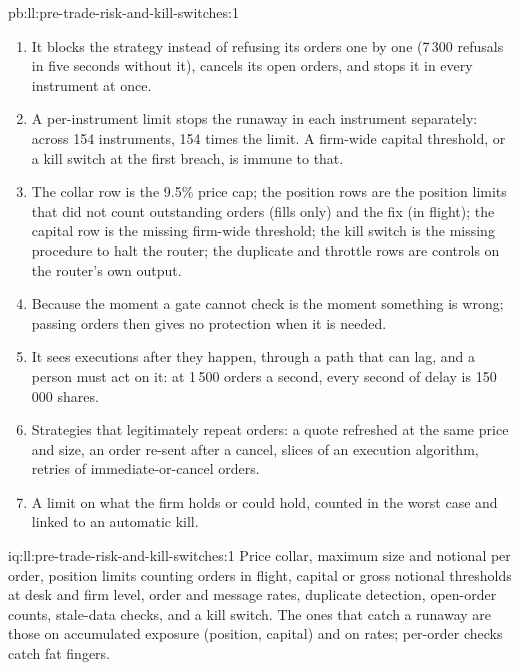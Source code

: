 \begin{solution}{pb:ll:pre-trade-risk-and-kill-switches:1}
\begin{enumerate}
notional limits per order, 7\,500 orders and 750\,000 shares in five seconds, 405 million shares carried over 45 minutes (the
incident: 397 million); with a throttle at 500 a second, 135 million; with a duplicate check, 3.0 million; with a position limit
of 20\,000 counted in flight, 200 orders and 20\,000 shares after \qty{130}{\milli\second} (21\,000 counting fills only); with a
capital threshold of \$2.5 million, 249 orders and 24\,900 shares.
\item It blocks the strategy instead of refusing its orders one by one (7\,300 refusals in five seconds without it), cancels
its open orders, and stops it in every instrument at once.
\item A per-instrument limit stops the runaway in each instrument separately: across 154 instruments, 154 times the limit. A
firm-wide capital threshold, or a kill switch at the first breach, is immune to that.
\item The collar row is the 9.5\% price cap; the position rows are the position limits that did not count outstanding
orders (fills only) and the fix (in flight); the capital row is the missing firm-wide threshold; the kill switch is the missing
procedure to halt the router; the duplicate and throttle rows are controls on the router's own output.
\item Because the moment a gate cannot check is the moment something is wrong; passing orders then gives no protection when
it is needed.
\item It sees executions after they happen, through a path that can lag, and a person must act on it: at 1\,500 orders a
second, every second of delay is 150\,000 shares.
\item Strategies that legitimately repeat orders: a quote refreshed at the same price and size, an order re-sent after a
cancel, slices of an execution algorithm, retries of immediate-or-cancel orders.
\item A limit on what the firm holds or could hold, counted in the worst case and linked to an automatic kill.
\end{enumerate}
\end{solution}

\begin{solution}{iq:ll:pre-trade-risk-and-kill-switches:1}
Price collar, maximum size and notional per order, position limits counting orders in flight, capital or gross notional
thresholds at desk and firm level, order and message rates, duplicate detection, open-order counts, stale-data checks, and a kill
switch. The ones that catch a runaway are those on accumulated exposure (position, capital) and on rates; per-order checks
catch fat fingers.
\end{solution}

